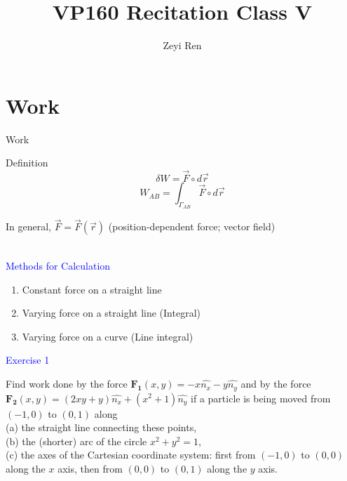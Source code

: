 \documentclass{beamer}
\title{VP160 Recitation Class V}
\author{Zeyi Ren}
\institute{UM-SJTU Joint Institute}
\begin{document}
\maketitle

\section{Work}
\begin{frame}{Work}
  \begin{block}{Definition}
    \begin{equation}\delta W = \vec{F}\circ d\vec{r}\end{equation}
    \begin{equation}
    W_{AB}=\int_{\Gamma_{A B}} \vec{F}\circ d\vec{r} 
    \end{equation}
    \begin{center}In general, $\vec{F} = \vec{F}(\vec{r})$ (position-dependent force; vector field)\end{center}
  \end{block}
  ~\\
  \textcolor{blue}{Methods for Calculation}\\
\begin{enumerate}
  \item Constant force on a straight line
  \item Varying force on a straight line (Integral)
  \item Varying force on a curve (Line integral)
\end{enumerate}
\end{frame}

\begin{frame}
\textcolor{blue}{Exercise 1}

Find work done by the force $\mathbf{F_1}(x,y) = -x\hat{n_x} -y\hat{n_y}$ and by the force $\mathbf{F_2}(x,y) = (2xy + y)\hat{n_x} + (x^2 + 1)\hat{n_y}$ if a particle is being moved from $(-1, 0)$ to $(0, 1)$ along\\
(a) the straight line connecting these points,\\
(b) the (shorter) arc of the circle $x^2 + y^2 = 1$,\\
(c) the axes of the Cartesian coordinate system: first from $(-1, 0)$ to $(0, 0)$ along the $x$ axis, then from $(0, 0)$ to $(0, 1)$ along the $y$ axis.
\end{frame}
\end{document}
